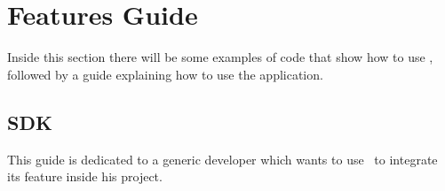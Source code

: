 \section{Features Guide}
Inside this section there will be some examples of code that show how to use \progettoShort, followed by a guide explaining how to use the \app application.

\subsection{SDK}
This guide is dedicated to a generic developer which wants to use \progettoShort\ to integrate its feature inside his  project. 






